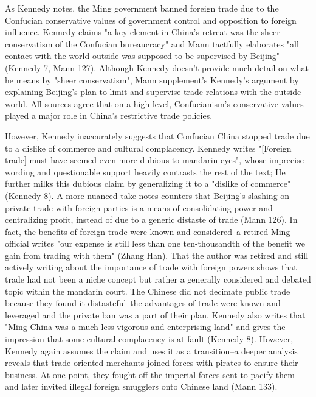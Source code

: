 \documentclass[letterpaper]{article}
\begin{document}
As Kennedy notes, the Ming government banned foreign trade due to the
Confucian conservative values of government control and opposition to
foreign influence. Kennedy claims "a key element in China's retreat was
the sheer conservatism of the Confucian bureaucracy" and Mann tactfully
elaborates "all contact with the world outside was supposed to be
supervised by Beijing" (Kennedy 7, Mann 127). Although Kennedy doesn't
provide much detail on what he means by "sheer conservatism", Mann
supplement's Kennedy's argument by explaining Beijing's plan to limit
and supervise trade relations with the outside world. All sources agree
that on a high level, Confucianism's conservative values played a major
role in China's restrictive trade policies.

However, Kennedy inaccurately suggests that Confucian China stopped
trade due to a dislike of commerce and cultural complacency. Kennedy
writes "[Foreign trade] must have seemed even more dubious to mandarin
eyes", whose imprecise wording and questionable support heavily
contrasts the rest of the text; He further milks this dubious claim by
generalizing it to a "dislike of commerce" (Kennedy 8). A more nuanced
take notes counters that Beijing's slashing on private trade with
foreign parties is a means of consolidating power and centralizing
profit, instead of due to a generic distaste of trade (Mann 126). In
fact, the benefits of foreign trade were known and considered--a retired
Ming official writes "our expense is still less than one ten-thousandth
of the benefit we gain from trading with them" (Zhang Han). That the
author was retired and still actively writing about the importance of
trade with foreign powers shows that trade had not been a niche concept
but rather a generally considered and debated topic within the mandarin
court. The Chinese did not decimate public trade because they found it
distasteful--the advantages of trade were known and leveraged and the
private ban was a part of their plan. Kennedy also writes that "Ming
China was a much less vigorous and enterprising land" and gives the
impression that some cultural complacency is at fault (Kennedy 8).
However, Kennedy again assumes the claim and uses it as a transition--a
deeper analysis reveals that trade-oriented merchants joined forces with
pirates to ensure their business. At one point, they fought off the
imperial forces sent to pacify them and later invited illegal foreign
smugglers onto Chinese land (Mann 133).
\end{document}
